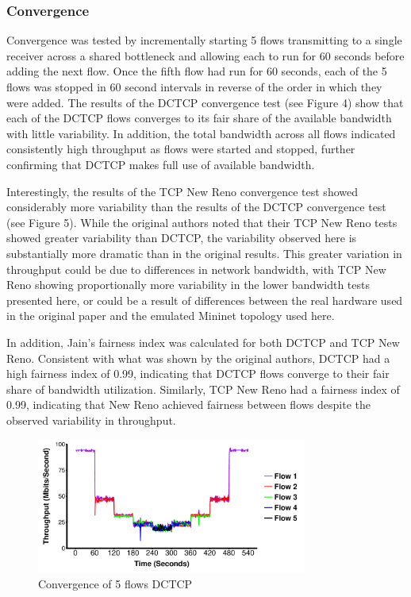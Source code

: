 \subsubsection{Convergence}

Convergence was tested by incrementally starting 5 flows transmitting to a single receiver across a shared bottleneck and allowing each to run for 60 seconds before adding the next flow. Once the fifth flow had run for 60 seconds, each of the 5 flows was stopped in 60 second intervals in reverse of the order in which they were added. The results of the DCTCP convergence test (see Figure 4) show that each of the DCTCP flows converges to its fair share of the available bandwidth with little variability. In addition, the total bandwidth across all flows indicated consistently high throughput as flows were started and stopped, further confirming that DCTCP makes full use of available bandwidth.

Interestingly, the results of the TCP New Reno convergence test showed considerably more variability than the results of the DCTCP convergence test (see Figure 5). While the original authors noted that their TCP New Reno tests showed greater variability than DCTCP, the variability observed here is substantially more dramatic than in the original results. This greater variation in throughput could be due to differences in network bandwidth, with TCP New Reno showing proportionally more variability in the lower bandwidth tests presented here, or could be a result of differences between the real hardware used in the original paper and the emulated Mininet topology used here.

In addition, Jain's fairness index was calculated for both DCTCP and TCP New Reno. Consistent with what was shown by the original authors, DCTCP had a high fairness index of 0.99, indicating that DCTCP flows converge to their fair share of bandwidth utilization. Similarly, TCP New Reno had a fairness index of 0.99, indicating that New Reno achieved fairness between flows despite the observed variability in throughput. 

\begin{figure}
\includegraphics[height=1.75in,width=3.5in]{dctcp_converg}
\caption{Convergence of 5 flows DCTCP}
\end{figure}

